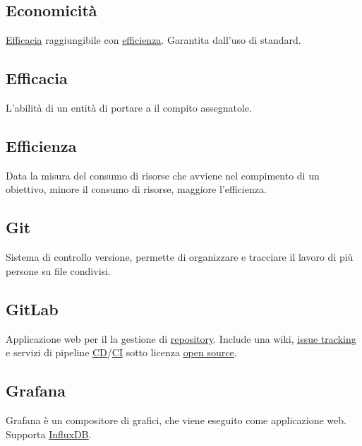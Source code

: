 	\subsection{Economicità}
	\label{sec:economicita}
	\underline{\hyperref[sec:efficacia]{Efficacia}} raggiungibile con \underline{\hyperref[sec:efficienza]{efficienza}}. Garantita dall'uso di standard.
	
	\subsection{Efficacia}
	\label{sec:efficacia}
	L'abilità di un entità di portare a il compito assegnatole.
	
	\subsection{Efficienza}
	\label{sec:efficienza}
	Data la misura del consumo di risorse che avviene nel compimento di un obiettivo, minore il consumo di risorse, maggiore l'efficienza.\newpage

	
	\subsection{Git}
	\label{sec:git}	
	Sistema di controllo versione, permette di organizzare e tracciare il lavoro di più persone su file condivisi.
	
	\subsection{GitLab}
	\label{sec:git}	
	Applicazione web per il la gestione di \underline{\hyperref[sec:repo]{repository}}. Include una wiki, \underline{\hyperref[sec:issuetrack]{issue tracking}} e servizi di pipeline \underline{\hyperref[sec:continuousdelivery]{CD}}/\underline{\hyperref[sec:continuousintegration]{CI}} sotto licenza \underline{\hyperref[sec:opensource]{open source}}.
	
	\subsection{Grafana}
	\label{sec:grafana}	
	Grafana è un compositore di grafici, che viene eseguito come applicazione web. Supporta \underline{\hyperref[sec:influxdb]{InfluxDB}}.
	
